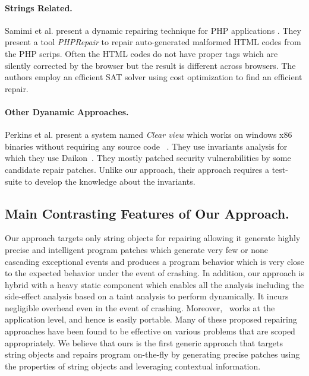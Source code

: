 \paragraph{Strings Related.}
Samimi et al. present a dynamic repairing technique for PHP applications  \cite{SamirniSAMTH12}.
They present a tool \textit{PHPRepair} to repair auto-generated
malformed HTML codes from the PHP scrips. Often the HTML codes do not have
proper tags which are silently corrected by the browser but the result is
different across browsers. The authors employ an efficient SAT solver
using cost optimization to find an efficient repair.

\paragraph{Other Dyanamic Approaches.}
Perkins et al. present a system named \emph{Clear view} which works on windows x86 binaries
without requiring any source code ~\cite{conf/sosp/PerkinsKLABCPSSSWZER09}.
They use invariants analysis for which they
use Daikon~\cite{DBLP:journals/scp/ErnstPGMPTX07}. They mostly patched security
vulnerabilities by some candidate repair patches. Unlike our approach, their approach requires a test-suite
to develop the knowledge about the invariants.

\subsection{Main Contrasting Features of Our Approach.}
Our approach targets only string objects for repairing allowing it
generate highly precise and intelligent program patches which generate very few or none
cascading exceptional events and produces a program behavior which is very close
to the expected behavior under the event of crashing.
In addition, our approach is hybrid with a heavy static component which enables
all the analysis including the side-effect analysis based on a taint analysis to
perform dynamically. It incurs negligible overhead even in the event of
crashing. Moreover, \tool\ works at the application level, and hence is easily portable.
Many of these proposed repairing approaches have been found to be effective on
various problems that are scoped appropriately. We believe that ours is the first
generic approach that targets string objects and repairs program on-the-fly by
generating precise patches using the properties of string objects and leveraging contextual
information.
